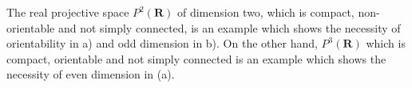 \begin{remark}
  \label{rem:dc-ch9-3-11}
  The real projective space $P^2(\mathbf{R})$ of dimension two, which is compact,
  non-orientable and not simply connected, is an example which shows the necessity of
  orientability in a) and odd dimension in b). On the other hand, $P^3(\mathbf{R})$
  which is compact, orientable and not simply connected is an example which shows the
  necessity of even dimension in (a).
\end{remark}

